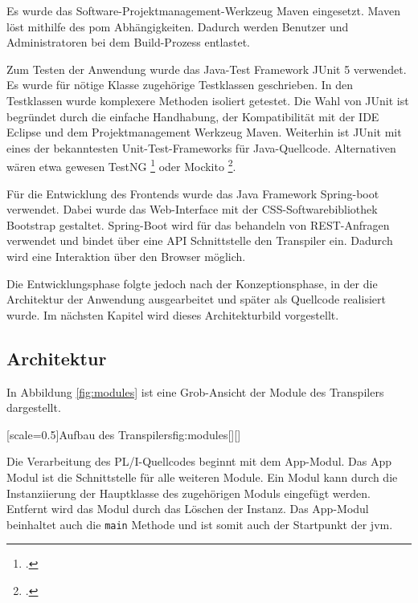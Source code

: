 Es wurde das Software-Projektmanagement-Werkzeug Maven eingesetzt. Maven löst mithilfe des \ac{pom} Abhängigkeiten. 
Dadurch werden Benutzer und Administratoren bei dem Build-Prozess entlastet.

Zum Testen der Anwendung wurde das Java-Test Framework JUnit 5 verwendet. Es wurde für nötige Klasse zugehörige Testklassen geschrieben. In den Testklassen wurde komplexere Methoden isoliert getestet.
Die Wahl von JUnit ist begründet durch die einfache Handhabung, der Kompatibilität mit der IDE Eclipse und dem Projektmanagement Werkzeug Maven. Weiterhin ist JUnit mit eines der bekanntesten Unit-Test-Frameworks für Java-Quellcode. Alternativen wären etwa gewesen TestNG \footcite[Vgl. ][]{testng} oder Mockito \footcite[Vgl. ][]{mockito}.

Für die Entwicklung des Frontends wurde das Java Framework Spring-boot verwendet.
Dabei wurde das Web-Interface mit der CSS-Softwarebibliothek Bootstrap gestaltet.
Spring-Boot wird für das behandeln von REST-Anfragen verwendet und bindet über eine API Schnittstelle den Transpiler ein.
Dadurch wird eine Interaktion über den Browser möglich.

Die Entwicklungsphase folgte jedoch nach der Konzeptionsphase, in der die Architektur der Anwendung ausgearbeitet und später als Quellcode realisiert wurde. 
Im nächsten Kapitel wird dieses Architekturbild vorgestellt.

\pagebreak
\subsection{Architektur} 

In Abbildung \ref{fig:modules} ist eine Grob-Ansicht der Module des Transpilers dargestellt.

[scale=0.5]{Aufbau des Transpilers}{fig:modules}[][]

Die Verarbeitung des PL/I-Quellcodes beginnt mit dem App-Modul. Das App Modul ist die Schnittstelle für alle weiteren Module. Ein Modul kann durch die Instanziierung der Hauptklasse des zugehörigen Moduls eingefügt werden. Entfernt wird das Modul durch das Löschen der Instanz. Das App-Modul beinhaltet auch die \verb+main+ Methode und ist somit auch der Startpunkt der \ac{jvm}.

